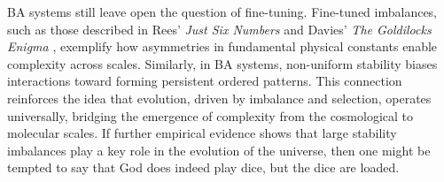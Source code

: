 \documentclass[preprint,12pt]{elsarticle}
\begin{document}
BA systems still leave open the question of fine-tuning. Fine-tuned imbalances, such as those described in Rees' \textit{Just Six Numbers} \cite{rees2000just} and Davies' \textit{The Goldilocks Enigma} \cite{davies2006goldilocks}, exemplify how asymmetries in fundamental physical constants enable complexity across scales. Similarly, in BA systems,  non-uniform stability biases interactions toward forming persistent ordered patterns. This connection reinforces the idea that evolution, driven by imbalance and selection, operates universally, bridging the emergence of complexity from the cosmological to molecular scales. If further empirical evidence shows that large stability imbalances play a key role in the evolution of the universe, then one might be tempted to say that God does indeed play dice, but the dice are loaded.



\vspace{6pt} 



\end{document}
